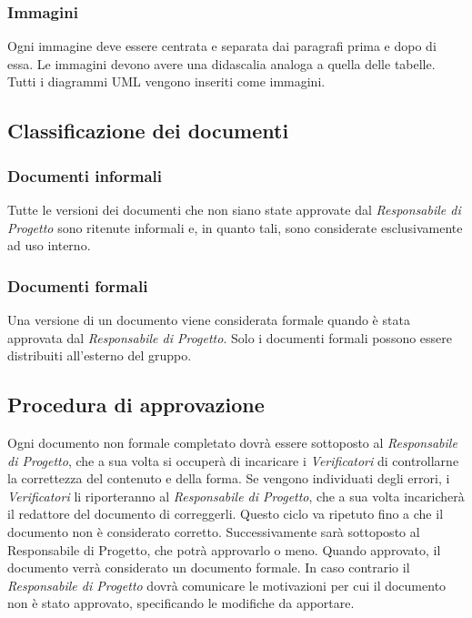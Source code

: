 \documentclass[./../NormediProgetto.tex]{subfiles}
\begin{document}
\subsubsection{Immagini}

Ogni immagine deve essere centrata e separata dai paragrafi prima e dopo di essa. Le immagini devono avere una didascalia analoga a quella delle tabelle. Tutti i diagrammi UML vengono inseriti come immagini.

\subsection{Classificazione dei documenti}

\subsubsection{Documenti informali}

Tutte le versioni dei documenti che non siano state approvate dal \textit{Responsabile di Progetto} sono ritenute informali e, in quanto tali, sono considerate esclusivamente ad uso interno.

\subsubsection{Documenti formali}

Una versione di un documento viene considerata formale quando è stata approvata dal \textit{Responsabile di Progetto}. Solo i documenti formali possono essere distribuiti all’esterno del gruppo. 

\subsection{Procedura di approvazione}

Ogni documento non formale completato dovrà essere sottoposto al \textit{Responsabile di Progetto}, che a sua volta si occuperà di incaricare i \textit{Verificatori} di controllarne la correttezza del contenuto e della forma. Se vengono individuati degli errori, i \textit{Verificatori} li riporteranno al \textit{Responsabile di Progetto}, che a sua volta incaricherà il redattore del documento di correggerli. Questo ciclo va ripetuto fino a che il documento non è considerato corretto. Successivamente sarà sottoposto al Responsabile di Progetto, che potrà approvarlo o meno. Quando approvato, il documento verrà considerato un documento formale. In caso contrario il \textit{Responsabile di Progetto} dovrà comunicare le motivazioni per cui il documento non è stato approvato, specificando le modifiche da apportare.
\end{document}
